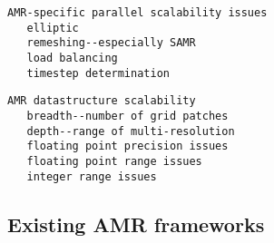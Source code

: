 \documentclass{article}
\begin{document}
\begin{verbatim}
AMR-specific parallel scalability issues
   elliptic
   remeshing--especially SAMR
   load balancing
   timestep determination
\end{verbatim}

\begin{verbatim}
AMR datastructure scalability
   breadth--number of grid patches
   depth--range of multi-resolution
   floating point precision issues
   floating point range issues
   integer range issues
\end{verbatim}

\subsection{Existing AMR frameworks} \label{ss:review}
\end{document}
